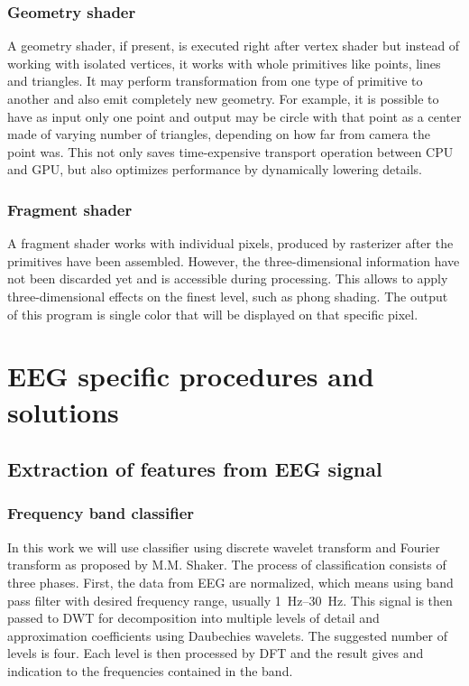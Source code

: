 \subsection{Geometry shader}
A geometry shader, if present, is executed right after vertex shader but instead
of working with isolated vertices, it works with whole primitives like points,
lines and triangles. It may perform transformation from one type of primitive to
another and also emit completely new geometry. For example, it is possible to
have as input only one point and output may be circle with that point as a
center made of varying number of triangles, depending on how far from camera
the point was. This not only saves time-expensive transport operation between
CPU and GPU, but also optimizes performance by dynamically lowering details.

\subsection{Fragment shader}
A fragment shader works with individual pixels, produced by rasterizer after the
primitives have been assembled. However, the three-dimensional information have
not been discarded yet and is accessible during processing. This allows to apply
three-dimensional effects on the finest level, such as phong shading. The output
of this program is single color that will be displayed on that specific pixel.

\chapter{EEG specific procedures and solutions}
\label{eegProcAndSol}
\section{Extraction of features from EEG signal}
\label{signalExtraction}
\subsection{Frequency band classifier}
\label{eegClassifier}
In this work we will use classifier using discrete wavelet transform and Fourier
transform as proposed by M.M. Shaker. \cite{eegWaveFt} The process of
classification consists of three phases. First, the data from EEG are
normalized, which means using band pass filter with desired frequency range,
usually \SIrange{1}{30}{\Hz}. This signal is then passed to DWT for
decomposition into multiple levels of detail and approximation
coefficients using Daubechies wavelets. The suggested number of levels is four.
Each level is then processed by DFT and the result gives and indication to the
frequencies contained in the band.


